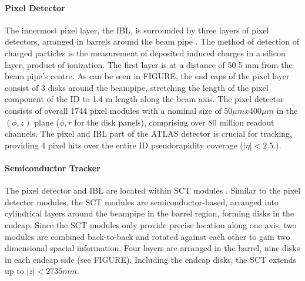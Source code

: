 \paragraph{Pixel Detector}
The innermost pixel layer, the IBL, is surrounded by three layers of pixel detectors, arranged in barrels around the beam pipe \cite{PixelDesignPerformance,PixelPerformanceProceedings}. The method of detection of charged particles is the measurement of deposited induced charges in a silicon layer, product of ionization. The first layer is at a distance of 50.5 mm from the beam pipe's centre.  As can be seen in FIGURE,  the end caps of the pixel layer consist of 3 disks around the beampipe,  stretching the length of the pixel component of the \ac{ID} to 1.4 m length along the beam axis.  The pixel detector consists of overall 1744 pixel modules with a nominal size of $50 \mu m x 400 \mu m$ in the $(\phi, z)$ plane ($\phi, r$ for the disk panels), comprising over 80 million readout channels.  
The pixel and \ac{IBL} part of the ATLAS detector is crucial for tracking, providing 4 pixel hits over the entire \ac{ID} pseudorapidity coverage ($|\eta| < 2.5.$).  

\paragraph{Semiconductor Tracker}
The pixel detector and \ac{IBL} are located within \ac{SCT} modules \cite{SCT}.  
Similar to the pixel detector modules, the \ac{SCT} modules are semiconductor-based, arranged into cylindrical layers around the beampipe in the barrel region, forming disks in the endcap. Since the \ac{SCT} modules only provide precise location along one axis, two modules are combined back-to-back and rotated against each other to gain two dimensional spacial information. Four layers are arranged in the barrel, nine disks in each endcap side (see FIGURE). Including the endcap disks, the \ac{SCT} extends up to $|z| < 2735 mm$.

